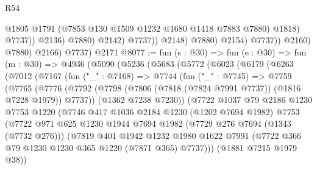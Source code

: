 \begin{lexlean}{R54}
\begin{coremodule}
                                      @1805
                                      @1791
                                      (@7853 @130 @1509 @1232 @1680 @1418 @7883 @7880)
                                      @1818)
                                    @7737))
                                @2136)
                              @7880)
                            @2142)
                          @7737))
                      @2148)
                    @7880)
                  @2154)
                @7737))
            @2160)
          @7880)
        @2166)
      @7737)
    @2171
@8077 := fun (s : @30) =>
  fun (e : @30) =>
  fun (m : @30) =>
  @4936
    (@5090
      (@5236
        (@5683
          (@5772
            (@6023
              (@6179
                (@6263
                  (@7012
                    (@7167
                      (fun ("_" : @7168) =>
                      @7744
                        (fun ("_" : @7745) =>
                        @7759
                          (@7765
                            (@7776
                              (@7792
                                (@7798
                                  (@7806 (@7818 (@7824 @7991 @7737)) (@1816 @7228 @1979))
                                  @7737))
                              (@1362 @7238 @7230))
                            (@7722
                              @1037
                              @79
                              @2186
                              @1230
                              @7753
                              @1220
                              (@7746
                                @417
                                @1036
                                @2184
                                @1230
                                (@1202 @7694 @1982)
                                @7753
                                (@7722
                                  @971
                                  @625
                                  @1230
                                  @1944
                                  @7694
                                  @1982
                                  (@7729 @276 @7694 (@1343 (@7732 @276)))
                                  (@7819
                                    @401
                                    @1942
                                    @1232
                                    @1980
                                    @1622
                                    @7991
                                    (@7722 @366 @79 @1230 @1230 @365 @1220 (@7871 @365) @7737)))
                                (@1881 @7215 @1979 @38))

\end{coremodule}
\end{lexlean}
